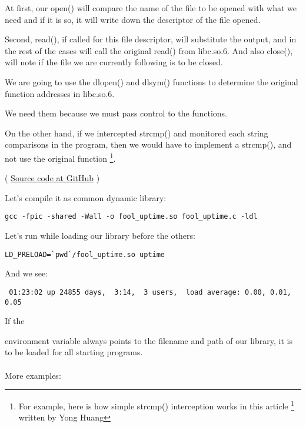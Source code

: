 At first, our open() will compare the name of the file to be opened with what we need and if it is so,
it will write down the descriptor of the file opened.

Second, read(), if called for this file descriptor, will substitute the output,
and in the rest of the cases will call the original read() from libc.so.6.
And also close(), 
will note if the file we are currently following is to be closed.


We are going to use the dlopen() and dlsym() functions to determine the original function addresses in libc.so.6.

We need them because we must pass control to the  functions.


On the other hand, if we intercepted strcmp() and monitored each string
comparisons in the program, then we would have to implement a strcmp(), and not
use the original function
\footnote{For example, here is how simple strcmp() interception works in this article
\footnote{\href{http://go.yurichev.com/17143}{yurichev.com}}
written by Yong Huang}.


( \href{https://github.com/dennis714/RE-for-beginners/blob/master/OS/LD_PRELOAD/fool_uptime.c}{Source code at GitHub} )

Let's compile it as common dynamic library:

\begin{lstlisting}
gcc -fpic -shared -Wall -o fool_uptime.so fool_uptime.c -ldl
\end{lstlisting}

Let's run 
while loading our library before the others:

\begin{lstlisting}
LD_PRELOAD=`pwd`/fool_uptime.so uptime
\end{lstlisting}

And we see:

\begin{lstlisting}
 01:23:02 up 24855 days,  3:14,  3 users,  load average: 0.00, 0.01, 0.05
\end{lstlisting}

If the  

environment variable always points to the filename and path of our library, 
it is to be loaded for all starting programs. \\
\\
More examples:

